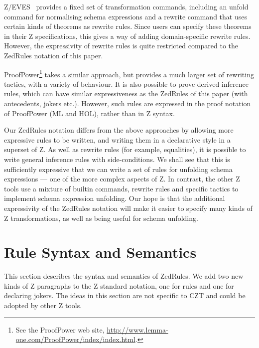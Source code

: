 \documentclass{entcs}
\begin{document}
Z/EVES~\cite{zeves:98} provides a fixed set of transformation
commands, including an unfold command for normalising schema
expressions and a rewrite command that uses certain kinds of theorems
as rewrite rules.  Since users can specify these theorems in their Z
specifications, this gives a way of adding domain-specific rewrite
rules.  However, the expressivity of rewrite rules is quite restricted
compared to the ZedRules notation of this paper.

ProofPower\footnote{See the ProofPower web site,
\url{http://www.lemma-one.com/ProofPower/index/index.html}.} takes a
similar approach, but provides a much larger set of rewriting tactics,
with a variety of behaviour.  It is also possible to prove derived
inference rules, which can have similar expressiveness as the ZedRules
of this paper (with antecedents, jokers etc.).  However, such rules
are expressed in the proof notation of ProofPower (ML and HOL), rather
than in Z syntax.

Our ZedRules notation differs from the above approaches by allowing
more expressive rules to be written, and writing them in a declarative
style in a superset of Z.  As well as rewrite rules (for example,
equalities), it is possible to write general inference rules with
side-conditions.  We shall see that this is sufficiently expressive
that we can write a set of rules for unfolding schema expressions ---
one of the more complex aspects of Z.  In contrast, the other Z tools
use a mixture of builtin commands, rewrite rules and specific tactics
to implement schema expression unfolding.  Our hope is that the
additional expressivity of the ZedRules notation will make it easier
to specify many kinds of Z transformations, as well as being useful
for schema unfolding.




\section{Rule Syntax and Semantics} \label{sec:syntax}

This section describes the syntax and semantics of ZedRules.  We add
two new kinds of Z paragraphs to the Z standard notation, one for
rules and one for declaring jokers.  The ideas in this section are not
specific to CZT and could be adopted by other Z tools.
\end{document}
